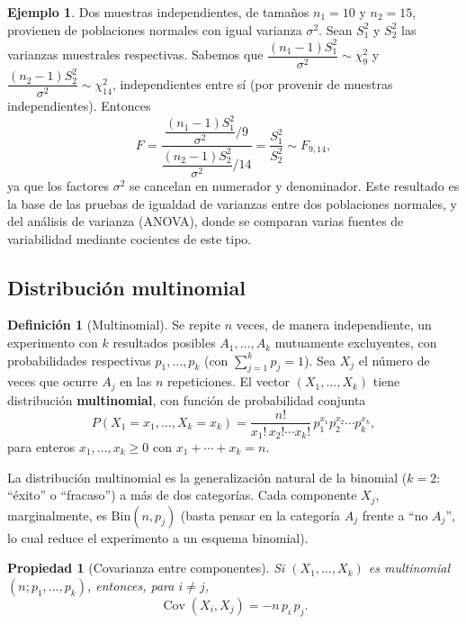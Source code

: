 \documentclass[11pt,a4paper]{article}
\theoremstyle{plain}
\newtheorem{propiedad}[teorema]{Propiedad}
\theoremstyle{definition}
\newtheorem{definicion}[teorema]{Definición}
\newtheorem{ejemplo}[teorema]{Ejemplo}
\theoremstyle{remark}
\begin{document}
\begin{ejemplo}
Dos muestras independientes, de tamaños $n_1=10$ y $n_2=15$, provienen de poblaciones normales con igual varianza $\sigma^2$. Sean $S_1^2$ y $S_2^2$ las varianzas muestrales respectivas. Sabemos que $\dfrac{(n_1-1)S_1^2}{\sigma^2}\sim\chi_9^2$ y $\dfrac{(n_2-1)S_2^2}{\sigma^2}\sim\chi_{14}^2$, independientes entre sí (por provenir de muestras independientes). Entonces
\[
F = \frac{\dfrac{(n_1-1)S_1^2}{\sigma^2}\Big/9}{\dfrac{(n_2-1)S_2^2}{\sigma^2}\Big/14} = \frac{S_1^2}{S_2^2} \sim F_{9,14},
\]
ya que los factores $\sigma^2$ se cancelan en numerador y denominador. Este resultado es la base de las pruebas de igualdad de varianzas entre dos poblaciones normales, y del análisis de varianza (ANOVA), donde se comparan varias fuentes de variabilidad mediante cocientes de este tipo.
\end{ejemplo}

\subsection{Distribución multinomial}

\begin{definicion}[Multinomial]
Se repite $n$ veces, de manera independiente, un experimento con $k$ resultados posibles $A_1,\dots,A_k$ mutuamente excluyentes, con probabilidades respectivas $p_1,\dots,p_k$ (con $\sum_{j=1}^k p_j=1$). Sea $X_j$ el número de veces que ocurre $A_j$ en las $n$ repeticiones. El vector $(X_1,\dots,X_k)$ tiene distribución \textbf{multinomial}, con función de probabilidad conjunta
\[
P(X_1=x_1,\dots,X_k=x_k) = \frac{n!}{x_1!\,x_2!\cdots x_k!}\,p_1^{x_1}p_2^{x_2}\cdots p_k^{x_k},
\]
para enteros $x_1,\dots,x_k\ge0$ con $x_1+\cdots+x_k=n$.
\end{definicion}

La distribución multinomial es la generalización natural de la binomial ($k=2$: ``éxito'' o ``fracaso'') a más de dos categorías. Cada componente $X_j$, marginalmente, es $\text{Bin}(n,p_j)$ (basta pensar en la categoría $A_j$ frente a ``no $A_j$'', lo cual reduce el experimento a un esquema binomial).

\begin{propiedad}[Covarianza entre componentes]\label{prop:cov-multinomial}
Si $(X_1,\dots,X_k)$ es multinomial$(n;p_1,\dots,p_k)$, entonces, para $i\ne j$,
\[
\operatorname{Cov}(X_i,X_j) = -n\,p_i\,p_j.
\]
\end{propiedad}
\end{document}
